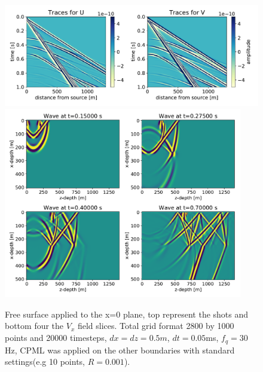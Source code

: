 \documentclass[10pt]{SelfArx} %
\theoremstyle{definition}
\begin{document}
\begin{figure}[!h]\label{fig:rayleigh_shots}
\includegraphics[width=\textwidth]{fig/rayleigh_shots.pdf}
\includegraphics[width=0.93\textwidth]{fig/rayleigh_fields.pdf}
\caption{Free surface applied to the x=0 plane, top represent the shots and bottom four the $V_x$ field slices. Total grid format 2800 by 1000 points and 20000 timesteps, $dx=dz=0.5m$, $dt=0.05$ms, $f_q=30$Hz, CPML was applied on the other boundaries with standard settings(e.g 10 points, $R=0.001$).  }
\end{figure}




\end{document}
